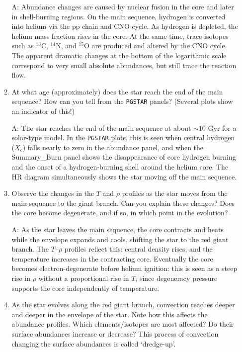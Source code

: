 \documentclass[11pt,a4paper]{article}
\begin{document}
\begin{enumerate}
\begin{enumerate}
{\color{blue} A: Abundance changes are caused by nuclear fusion in the core and later in shell-burning regions. On the main sequence, hydrogen is converted into helium via the pp chain and CNO cycle. As hydrogen is depleted, the helium mass fraction rises in the core. At the same time, trace isotopes such as $^{13}$C, $^{14}$N, and $^{15}$O are produced and altered by the CNO cycle. The apparent dramatic changes at the bottom of the logarithmic scale correspond to very small absolute abundances, but still trace the reaction flow.}


\item At what age (approximately) does the star reach the end of the main sequence? How can you tell from the \texttt{PGSTAR} panels? (Several plots show an indicator of this!)

{\color{blue} A: The star reaches the end of the main sequence at about $\sim 10$ Gyr for a solar-type model. In the \texttt{PGSTAR} plots, this is seen when central hydrogen ($X_c$) falls nearly to zero in the abundance panel, and when the Summary\_Burn panel shows the disappearance of core hydrogen burning and the onset of a hydrogen-burning shell around the helium core. The HR diagram simultaneously shows the star moving off the main sequence.}


\item Observe the changes in the $T$ and $\rho$ profiles as the star moves from the main sequence to the giant branch. Can you explain these changes? Does the core become degenerate, and if so, in which point in the evolution? 

{\color{blue} A: As the star leaves the main sequence, the core contracts and heats while the envelope expands and cools, shifting the star to the red giant branch. The $T$–$\rho$ profiles reflect this: central density rises, and the temperature increases in the contracting core. Eventually the core becomes electron-degenerate before helium ignition: this is seen as a steep rise in $\rho$ without a proportional rise in $T$, since degeneracy pressure supports the core independently of temperature.}


\item As the star evolves along the red giant branch, convection reaches deeper and deeper in the envelope of the star. Note how this affects the abundance profiles. Which elements/isotopes are most affected? Do their surface abundances increase or decrease? This process of convection changing the surface abundances is called `dredge-up'.
 

\end{enumerate}
\end{enumerate}
\end{document}
